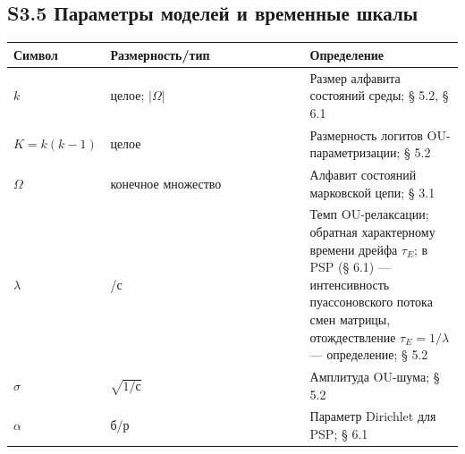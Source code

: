 \documentclass[pdflatex,sn-mathphys-ay]{sn-jnl}
\begin{document}
\subsection*{S3.5 Параметры моделей и временные шкалы}\label{s3.5-ux43fux430ux440ux430ux43cux435ux442ux440ux44b-ux43cux43eux434ux435ux43bux435ux439-ux438-ux432ux440ux435ux43cux435ux43dux43dux44bux435-ux448ux43aux430ux43bux44b}



\begin{center}\small
\begin{tabular}{@{} >{\raggedright\arraybackslash}p{0.2105\linewidth} >{\raggedright\arraybackslash}p{0.4474\linewidth} >{\raggedright\arraybackslash}p{0.3421\linewidth}@{}}
\toprule

\begin{minipage}[b]{\linewidth}\raggedright

Символ

\end{minipage} & \begin{minipage}[b]{\linewidth}\raggedright

Размерность/тип

\end{minipage} & \begin{minipage}[b]{\linewidth}\raggedright

Определение

\end{minipage} \\

\midrule

\(k\) & целое; \(\lvert\Omega\rvert\) & Размер алфавита состояний среды; § 5.2, § 6.1 \\

\(K = k(k-1)\) & целое & Размерность логитов OU-параметризации; § 5.2 \\

\(\Omega\) & конечное множество & Алфавит состояний марковской цепи; § 3.1 \\

\(\lambda\) & 1/с & Темп OU-релаксации; обратная характерному времени дрейфа \(\tau_E\); в PSP (§ 6.1) --- интенсивность пуассоновского потока смен матрицы, отождествление \(\tau_E = 1/\lambda\) --- определение; § 5.2 \\

\(\sigma\) & \(\sqrt{1/\text{с}}\) & Амплитуда OU-шума; § 5.2 \\

\(\alpha\) & б/р & Параметр Dirichlet для PSP; § 6.1 \\


\end{tabular}
\end{center}
\end{document}
